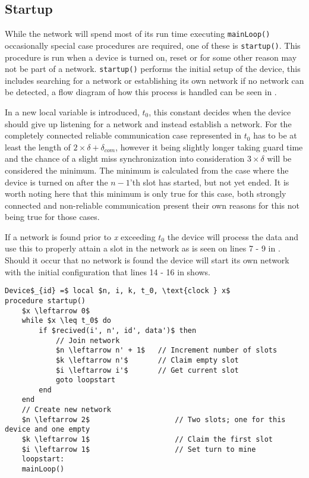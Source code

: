 \subsection{Startup} %
\label{sub:setup} 
While the network will spend most of its run time executing \texttt{mainLoop()} occasionally special case procedures are required, one of these is \texttt{startup()}.
This procedure is run when a device is turned on, reset or for some other reason may not be part of a network. 
\texttt{startup()} performs the initial setup of the device, this includes searching for a network or establishing its own network if no network can be detected, a flow diagram of how this process is handled can be seen in .

 
\bigskip \noindent
In  a new local variable is introduced, $t_0$, this constant decides when the device should give up listening for a network and instead establish a network.
For the completely connected reliable communication case represented in  $t_0$ has to be at least the length of $2 \times \delta + \delta_{com}$, however it being slightly longer taking guard time and the chance of a slight miss synchronization into consideration $3 \times \delta$ will be considered the minimum.
The minimum is calculated from the case where the device is turned on after the $n-1$'th slot has started, but not yet ended.
It is worth noting here that this minimum is only true for this case, both strongly connected and non-reliable communication present their own reasons for this not being true for those cases.

If a network is found prior to \textit{x} exceeding $t_0$ the device will process the data and use this to properly attain a slot in the network as is seen on lines 7 - 9 in .
Should it occur that no network is found the device will start its own network with the initial configuration that lines 14 - 16 in  shows.

\begin{minipage}{\linewidth} %
\begin{lstlisting}[label=lst:setup,style=pseudocode,mathescape=true,caption={Pseudocode example of the special case procedure startup()},basicstyle=\ttfamily]
Device$_{id} =$ local $n, i, k, t_0, \text{clock } x$
procedure startup()
    $x \leftarrow 0$
    while $x \leq t_0$ do
        if $recived(i', n', id', data')$ then
            // Join network
            $n \leftarrow n' + 1$   // Increment number of slots
            $k \leftarrow n'$       // Claim empty slot
            $i \leftarrow i'$       // Get current slot
            goto loopstart
        end
    end
    // Create new network
    $n \leftarrow 2$                    // Two slots; one for this device and one empty
    $k \leftarrow 1$                    // Claim the first slot
    $i \leftarrow 1$                    // Set turn to mine
    loopstart:
    mainLoop()
\end{lstlisting}   
\end{minipage}
